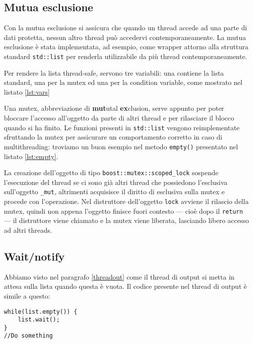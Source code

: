 \subsection{Mutua esclusione}

Con la mutua esclusione si assicura che quando un thread accede ad una parte di
dati protetta, nessun altro thread pu\`o accedervi contemporaneamente. La mutua
esclusione \`e stata implementata, ad esempio, come wrapper attorno alla
struttura standard \texttt{std::list} per renderla utilizzabile da pi\`u thread
contemporaneamente.

Per rendere la lista thread-safe, servono tre variabili: una contiene la lista
standard, una per la mutex ed una per la condition variable, come mostrato nel
listato \ref{lst:vars}

Una mutex, abbreviazione di \textbf{mut}utal \textbf{ex}clusion, serve appunto
per poter bloccare l'accesso all'oggetto da parte di altri thread e per
rilasciare il blocco quando si ha finito. Le funzioni presenti in
\texttt{std::list} vengono reimplementate sfruttando la mutex per assicurare un
comportamento corretto in caso di multithreading: troviamo un buon esempio nel
metodo \texttt{empty()} presentato nel listato \ref{lst:empty}.


La creazione dell'oggetto di tipo \texttt{boost::mutex::scoped\_lock} sospende
l'esecuzione del thread se ci sono gi\`a altri thread che possiedono l'esclusiva
sull'oggetto \texttt{\_mut}, altrimenti acquisisce il diritto di esclusiva
sulla mutex e procede con l'operazione. Nel distruttore dell'oggetto
\texttt{lock} avviene il rilascio della mutex, quindi non appena l'oggetto
finisce fuori contesto --- cio\`e dopo il \texttt{return} --- il distruttore
viene chiamato e la mutex viene liberata, lasciando libero accesso ad altri
threads.

\subsection{Wait/notify}
Abbiamo visto nel paragrafo \ref{threadout} come il thread di output si metta in
attesa sulla lista quando questa \`e vuota. Il codice presente nel thread di
output \`e simile a questo:
\begin{lstlisting}
while(list.empty()) {
    list.wait();
}
//Do something
\end{lstlisting}

